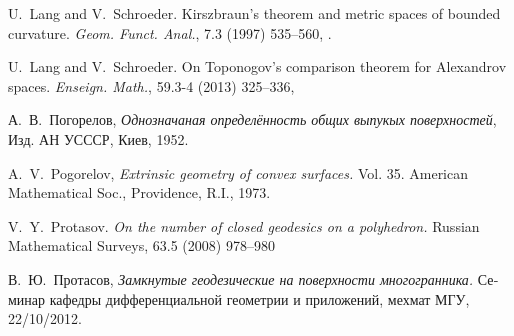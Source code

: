 \documentclass[oneside,a4paper, 12pt]{article}
\begin{document}
\begin{thebibliography}{52}


U.~Lang and V.~Schroeder.
\newblock Kirszbraun's theorem and metric spaces of bounded curvature.
\newblock \emph{Geom. Funct. Anal.}, 7.3 (1997) 535--560, .

U.~Lang and V.~Schroeder.
\newblock On {T}oponogov's comparison theorem for {A}lexandrov spaces.
\newblock \emph{Enseign. Math.}, 59.3-4 (2013) 325--336,

\begin{otherlanguage}{russian}
А.~В.~Погорелов,
\emph{Однозначаная определённость общих выпукых поверхностей},
Изд. АН УСССР, Киев, 1952.
\end{otherlanguage}

A.~V.~Pogorelov, \emph{Extrinsic geometry of convex surfaces.} 
Vol. 35. American Mathematical Soc., Providence, R.I., 1973.

V.~Y.~Protasov.
\newblock \emph{On the number of closed geodesics on a polyhedron.}
\newblock Russian Mathematical Surveys, 63.5 (2008) 978--980

\begin{otherlanguage}{russian}
В.~Ю.~Протасов,
\emph{Замкнутые геодезические на поверхности многогранника.}
Семинар кафедры дифференциальной геометрии и приложений, мехмат МГУ, 22/10/2012.
\end{otherlanguage}


\end{thebibliography}
\Addresses
\end{document}
